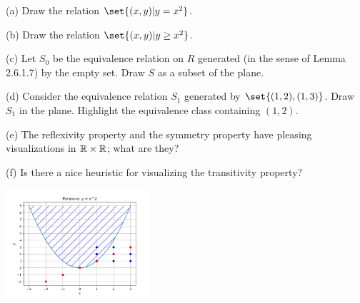 \documentclass{article}
\begin{document}
(a) Draw the relation $\set{(x,y)|y=x^2}$.

(b) Draw the relation $\set{(x,y)|y \ge x^2}$.

(c) Let $S_0$ be the equivalence relation on $R$ generated (in the sense of
Lemma 2.6.1.7) by the empty set. Draw $S$ as a subset of the plane.

(d) Consider the equivalence relation $S_1$ generated by $\set{(1,2),(1,3)}$.
Draw $S_1$ in the plane. Highlight the equivalence class containing $(1,2)$.

(e) The reflexivity property and the symmetry property have pleasing
visualizations in $\mathbb{R} \times \mathbb{R}$; what are they?

(f) Is there a nice heuristic for visualizing the transitivity property?

\ans

\begin{center}
\includegraphics[width=0.4\textwidth]{img/parabola.png}
\end{center}
\end{document}
